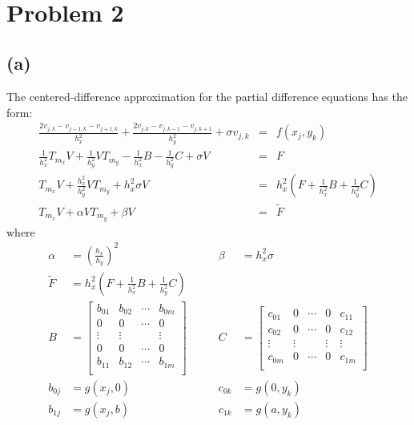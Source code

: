 \documentclass[11pt]{article}
\theoremstyle{definition}
\theoremstyle{remark}
\newcommand{\newquestion}{\hrulefill\vspace{-0.8\baselineskip}\\\null\hrulefill\vspace{-1.0\baselineskip}}
\newcommand{\newpart}{\vspace{-0.5\baselineskip}\hrulefill\vspace{-1.3\baselineskip}}
\theoremstyle{plain}
\begin{document}
\newpage
\newquestion
%
%
\section*{Problem 2}

\newpart
\subsection*{(a)}
The centered-difference approximation for the partial difference equations has the form:
\begin{eqnarray*}
  \frac{2v_{j,k}-v_{j-1,k}-v_{j+1,k}}{h_x^2}+\frac{2v_{j,k}-v_{j,k-1}-v_{j,k+1}}{h_y^2}+\sigma v_{j,k}&=&f\left(x_j,y_k\right)\\
  \frac{1}{h_x^2}T_{m_x}V+\frac{1}{h_y^2}VT_{m_y}-\frac{1}{h_x^2}B-\frac{1}{h_y^2}C+\sigma V&=&F\\
  T_{m_x}V+\frac{h_x^2}{h_y^2}VT_{m_y}+h_x^2\sigma V&=&h_x^2\left(F+\frac{1}{h_x^2}B+\frac{1}{h_y^2}C\right)\\
  T_{m_x}V+\alpha VT_{m_y}+\beta V&=&\tilde{F}
\end{eqnarray*}
where
\begin{align*}
  \alpha&=\left(\frac{h_x}{h_y}\right)^2&\beta&=h_x^2\sigma\\
  \tilde{F}&=h_x^2\left(F+\frac{1}{h_x^2}B+\frac{1}{h_y^2}C\right)\\
  B&=\left[
  \begin{array}{cccc}
    b_{01}&b_{02}&\cdots&b_{0m}\\
    0&0&\cdots&0\\
    \vdots&\vdots&&\vdots\\
    0&0&\cdots&0\\
    b_{11}&b_{12}&\cdots&b_{1m}\\
  \end{array}
  \right]\qquad &C&=\left[
  \begin{array}{ccccc}
    c_{01}&0&\cdots&0&c_{11}\\
    c_{02}&0&\cdots&0&c_{12}\\
    \vdots&\vdots&&\vdots&\vdots\\
    c_{0m}&0&\cdots&0&c_{1m}\\
  \end{array}
  \right]\\
  b_{0j}&=g\left(x_j,0\right)&c_{0k}&=g\left(0,y_k\right)\\
  b_{1j}&=g\left(x_j,b\right)&c_{1k}&=g\left(a,y_k\right)
\end{align*}
\end{document}
